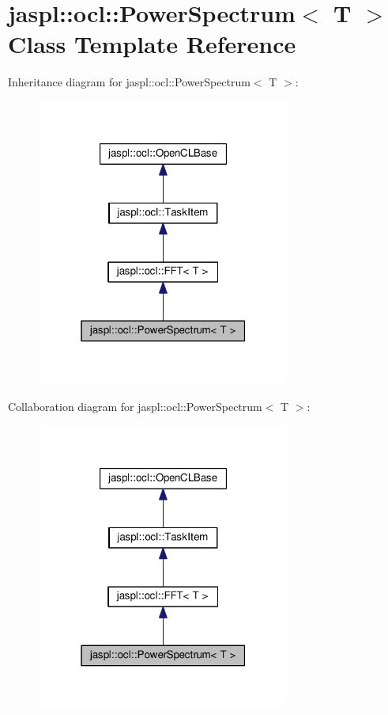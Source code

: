 \hypertarget{classjaspl_1_1ocl_1_1_power_spectrum}{}\section{jaspl\+:\+:ocl\+:\+:Power\+Spectrum$<$ T $>$ Class Template Reference}
\label{classjaspl_1_1ocl_1_1_power_spectrum}


Inheritance diagram for jaspl\+:\+:ocl\+:\+:Power\+Spectrum$<$ T $>$\+:\nopagebreak
\begin{figure}[H]
\begin{center}
\leavevmode
\includegraphics[width=235pt]{classjaspl_1_1ocl_1_1_power_spectrum__inherit__graph}
\end{center}
\end{figure}


Collaboration diagram for jaspl\+:\+:ocl\+:\+:Power\+Spectrum$<$ T $>$\+:\nopagebreak
\begin{figure}[H]
\begin{center}
\leavevmode
\includegraphics[width=235pt]{classjaspl_1_1ocl_1_1_power_spectrum__coll__graph}
\end{center}
\end{figure}
